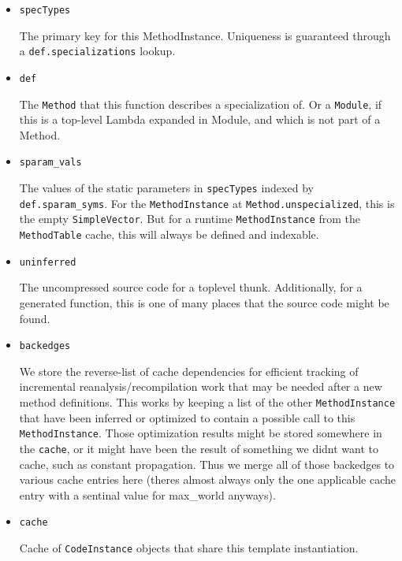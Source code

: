 \begin{itemize}
\item \texttt{specTypes}

The primary key for this MethodInstance. Uniqueness is guaranteed through a \texttt{def.specializations} lookup.


\item \texttt{def}

The \texttt{Method} that this function describes a specialization of. Or a \texttt{Module}, if this is a top-level Lambda expanded in Module, and which is not part of a Method.


\item \texttt{sparam\_vals}

The values of the static parameters in \texttt{specTypes} indexed by \texttt{def.sparam\_syms}. For the \texttt{MethodInstance} at \texttt{Method.unspecialized}, this is the empty \texttt{SimpleVector}. But for a runtime \texttt{MethodInstance} from the \texttt{MethodTable} cache, this will always be defined and indexable.


\item \texttt{uninferred}

The uncompressed source code for a toplevel thunk. Additionally, for a generated function, this is one of many places that the source code might be found.


\item \texttt{backedges}

We store the reverse-list of cache dependencies for efficient tracking of incremental reanalysis/recompilation work that may be needed after a new method definitions. This works by keeping a list of the other \texttt{MethodInstance} that have been inferred or optimized to contain a possible call to this \texttt{MethodInstance}. Those optimization results might be stored somewhere in the \texttt{cache}, or it might have been the result of something we didn{\textquotesingle}t want to cache, such as constant propagation. Thus we merge all of those backedges to various cache entries here (there{\textquotesingle}s almost always only the one applicable cache entry with a sentinal value for max\_world anyways).


\item \texttt{cache}

Cache of \texttt{CodeInstance} objects that share this template instantiation.

\end{itemize}


\hypertarget{17684444820224515276}{}


